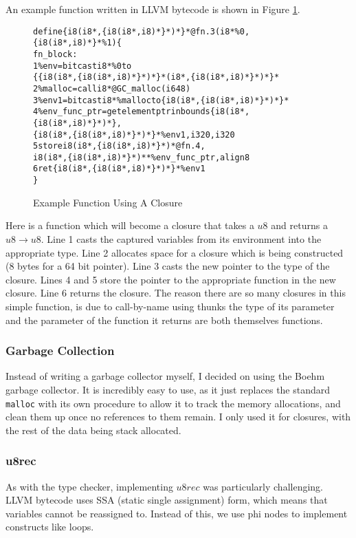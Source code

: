 An example function written in LLVM bytecode is shown in Figure \ref{fig:closure}.
\begin{figure}
    \begin{alltt}
define \{ i8 (i8*, \{ i8 (i8*, i8)* \}*)* \}* @fn.3(i8* \%0, \{ i8 (i8*, i8)* \}* \%1) \{
fn_block:
1 \%env = bitcast i8* \%0 to
    \{ \{ i8 (i8*, \{ i8 (i8*, i8)* \}*)* \}* (i8*, \{ i8 (i8*, i8)* \}*)* \}*
2 \%malloc = call i8* @GC_malloc(i64 8)
3 \%env1 = bitcast i8* \%malloc to \{ i8 (i8*, \{ i8 (i8*, i8)* \}*)* \}*
4 \%env_func_ptr = getelementptr inbounds \{ i8 (i8*, \{ i8 (i8*, i8)* \}*)* \},
    \{ i8 (i8*, \{ i8 (i8*, i8)* \}*)* \}* \%env1, i32 0, i32 0
5 store i8 (i8*, \{ i8 (i8*, i8)* \}*)* @fn.4,
    i8 (i8*, \{ i8 (i8*, i8)* \}*)** \%env_func_ptr, align 8
6 ret \{ i8 (i8*, \{ i8 (i8*, i8)* \}*)* \}* \%env1
\}
    \end{alltt}
    \caption{Example Function Using A Closure}
    \label{fig:closure}
\end{figure}
Here is a function which will become a closure that takes a $u8$ and returns a $u8 \rightarrow u8$.
Line 1 casts the captured variables from its environment into the appropriate type.
Line 2 allocates space for a closure which is being constructed (8 bytes for a 64 bit pointer).
Line 3 casts the new pointer to the type of the closure.
Lines 4 and 5 store the pointer to the appropriate function in the new closure.
Line 6 returns the closure.
The reason there are so many closures in this simple function, is due to call-by-name using thunks
the type of its parameter and the parameter of the function it returns are both themselves functions.

\subsubsection{Garbage Collection}

Instead of writing a garbage collector myself, I decided on using the Boehm garbage collector.
It is incredibly easy to use, as it just replaces the standard \texttt{malloc} with its own procedure
to allow it to track the memory allocations, and clean them up once no references to them remain.
I only used it for closures, with the rest of the data being stack allocated.

\subsubsection{u8rec}

As with the type checker, implementing $u8rec$ was particularly challenging.
LLVM bytecode uses SSA (static single assignment) form, which means that variables cannot be reassigned to.
Instead of this, we use phi nodes to implement constructs like loops.

